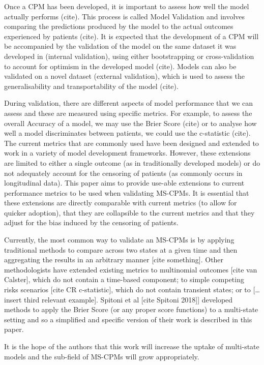 \documentclass[12pt,PhD,twoside,openright]{muthesis}
\begin{document}
Once a CPM has been developed, it is important to assess how well the model actually performs (cite). This process is called Model Validation and involves comparing the predictions produced by the model to the actual outcomes experienced by patients (cite). It is expected that the development of a CPM will be accompanied by the validation of the model on the same dataset it was developed in (internal validation), using either bootstrapping or cross-validation to account for optimism in the developed model (cite). Models can also be validated on a novel dataset (external validation), which is used to assess the generalisability and transportability of the model (cite).

During validation, there are different aspects of model performance that we can assess and these are measured using specific metrics. For example, to assess the overall Accuracy of a model, we may use the Brier Score (cite) or to analyse how well a model discriminates between patients, we could use the c-statistic (cite). The current metrics that are commonly used have been designed and extended to work in a variety of model development frameworks. However, these extensions are limited to either a single outcome (as in traditionally developed models) or do not adequately account for the censoring of patients (as commonly occurs in longitudinal data).
This paper aims to provide use-able extensions to current performance metrics to be used when validating MS-CPMs. It is essential that these extensions are directly comparable with current metrics (to allow for quicker adoption), that they are collapsible to the current metrics and that they adjust for the bias induced by the censoring of patients.

Currently, the most common way to validate an MS-CPMs is by applying traditional methods to compare across two states at a given time and then aggregating the results in an arbitrary manner {[}cite something{]}. Other methodologists have extended existing metrics to multinomial outcomes {[}cite van Calster{]}, which do not contain a time-based component; to simple competing risks scenarios {[}cite CR c-statistic{]}, which do not contain transient states; or to {[}\ldots{} insert third relevant example{]}. Spitoni et al {[}cite Spitoni 2018{]}{]} developed methods to apply the Brier Score (or any proper score functions) to a multi-state setting and so a simplified and specific version of their work is described in this paper.

It is the hope of the authors that this work will increase the uptake of multi-state models and the sub-field of MS-CPMs will grow appropriately.
\end{document}
